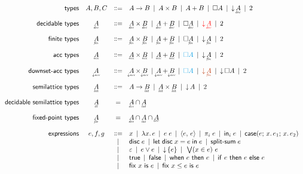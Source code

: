 \documentclass{article}
\begin{document}
\[
\begin{array}{rccl}
  \textsf{types} & A,B,C
  &\bnfeq& A \to B \pipe A \x B \pipe A + B
  \pipe \Disc{A} \pipe \Down{\eq{A}} \pipe \tbool
  \vspace{1em}\\

  \textsf{decidable types} & \eq{A}
  &\bnfeq& \eq{A} \x \eq{B} \pipe \eq{A} + \eq{B}
  \pipe \Disc{\eq{A}} \pipe {\color{red} \Down{\eq{A}}} \pipe \tbool
  \vspace{1em}\\

  \textsf{finite types} & \fin{A}
  &\bnfeq& \fin{A} \x \fin{B} \pipe \fin{A} + \fin{B}
  \pipe \Disc{\fin{A}} \pipe \Down{\fin{A}} \pipe \tbool
  \vspace{1em}\\

  \textsf{acc types} & \acc{A}
  &\bnfeq& \acc{A} \x \acc{B} \pipe \acc{A} + \acc{B}
  \pipe {\color{Cerulean} \Disc{A}} \pipe \Down{\fin{A}} \pipe \tbool
  \vspace{1em}\\

  \textsf{downset-acc types} & \eltacc{A}
  &\bnfeq& \eltacc{A} \x \eltacc{B} \pipe \eltacc{A} + \eltacc{B}
  \pipe {\color{Cerulean} \Disc{A}}
  \pipe {\color{Bittersweet} \Down{\fin{A}}} \pipe \Down{\Disc{A}}
  \pipe \tbool
  \vspace{1em}\\

  \textsf{semilattice types} & \lat{A}
  &\bnfeq& A \to \lat{B} \pipe \lat{A} \x \lat{B} \pipe \Down{A} \pipe \tbool
  \vspace{1em}\\

  \textsf{decidable semilattice types} & \eqlat{A}
  &=& \eq{A} \cap \lat{A}
  \vspace{1em}\\

  \textsf{fixed-point types} & \fixtype{A}
  &=& \eq{A} \cap \lat{A} \cap \acc{A}
  \vspace{1em}\\

  \textsf{expressions} & e,f,g
  &\bnfeq& x \pipe \fn\bind{x} e \pipe e\; e
  \pipe \pair{e}{e} \pipe \pi_i\; e
  \pipe \inj{i}{e} \pipe \case{e}{x}{e_1}{x}{e_2} \\
  &&\pipe& \disc{e} \pipe \letdisc{x}{e}{e} \pipe \splitsum{e}\\
  &&\pipe& \unit \pipe e \vee e \pipe \downintro{e} \pipe \downelim{x}{e}{e}\\
  &&\pipe& \etrue \pipe \efalse \pipe \when{e}{e} \pipe \ifthen{e}{e}{e}\\
  &&\pipe& \fix{x}{e} \pipe \fixle{x}{e}{e}
\end{array}
\]
\end{document}
